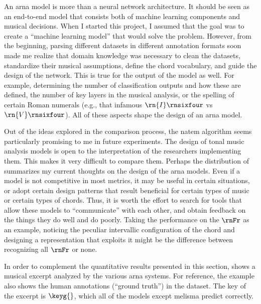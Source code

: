 
An \gls{arna} model is more than a neural network
architecture. It should be seen as an end-to-end model that
consists both of machine learning components and musical
decisions. When I started this project, I assumed that the
goal was to create a ``machine learning model'' that would
solve the problem. However, from the beginning, parsing
different datasets in different annotation formats soon made
me realize that domain knowledge was necessary to clean the
datasets, standardize their musical assumptions, define the
chord vocabulary, and guide the design of the network. This
is true for the output of the model as well. For example,
determining the number of classification outputs and how
these are defined, the number of key layers in the musical
analysis, or the spelling of certain Roman numerals (e.g.,
that infamous $\rn{I}\rnsixfour$ vs $\rn{V}\rnsixfour$). All
of these aspects shape the design of an \gls{arna} model.

Out of the ideas explored in the comparison process, the
\gls{natem} algorithm seems particularly promising to me in
future experiments. The design of tonal music analysis
models is open to the interpretation of the researchers
implementing them. This makes it very difficult to compare
them. Perhaps the distribution of 
summarizes my current thoughts on the design of the
\gls{arna} models. Even if a model is not competitive in
most metrics, it may be useful in certain situations, or
adopt certain design patterns that result beneficial for
certain types of music or certain types of chords. Thus, it
is worth the effort to search for tools that allow these
models to ``communicate'' with each other, and obtain
feedback on the things they do well and do poorly. Taking
the performance on the $\rnFr$ as an example, noticing the
peculiar intervallic configuration of the chord and
designing a representation that exploits it might be the
difference between recognizing all $\rnFr$ or none. 


In order to complement the quantitative results presented in
this section,  shows a musical
excerpt analyzed by the various \gls{arna} systems. For
reference, the example also shows the human annotations
(``ground truth'') in the dataset. The key of the excerpt is
$\keyg{}$, which all of the models except \gls{melisma}
predict correctly. 

